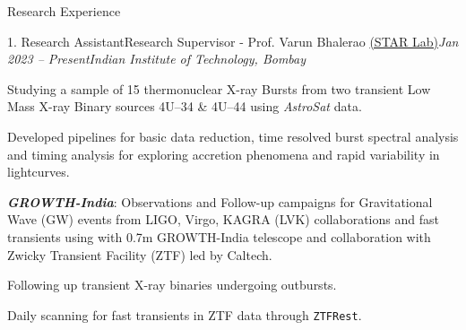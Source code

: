\vspace{-0.7em}
\begin{section}{Research Experience}
    
    \begin{subsection}{1. Research Assistant}{Research Supervisor - Prof. Varun Bhalerao \href{https://www.star-iitb.in/home}{(STAR Lab)}}{\textit{Jan 2023 -- Present}}{\textit{Indian Institute of Technology, Bombay}}
        \vspace{0.5em}
            \item Studying a sample of 15 thermonuclear X-ray Bursts from two transient Low Mass X-ray Binary sources 4U--34 \&  4U--44 using \textit{AstroSat} data.
            \item Developed pipelines for basic data reduction, time resolved burst spectral analysis and timing analysis for exploring accretion phenomena and rapid variability in lightcurves.
            
        \vspace{0.5em}
        
            \item \textit{\textbf{GROWTH-India}}: Observations and Follow-up campaigns for Gravitational Wave (GW) events from LIGO, Virgo, KAGRA (LVK) collaborations and fast transients using with 0.7m GROWTH-India telescope and collaboration with Zwicky Transient Facility (ZTF) led by Caltech. 
            \item Following up transient X-ray binaries undergoing outbursts.
            \item Daily scanning for fast transients in ZTF data through \texttt{ZTFRest}.
            

\end{subsection}
\end{section}
